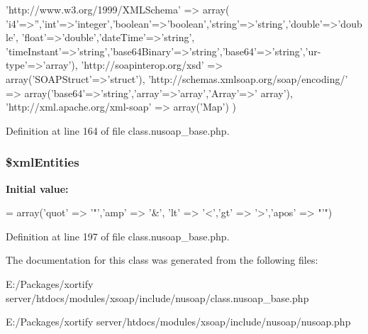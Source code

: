 \begin{DoxyCode}
    \textcolor{stringliteral}{'http://www.w3.org/1999/XMLSchema'} => array(
        \textcolor{stringliteral}{'i4'}=>\textcolor{stringliteral}{''},\textcolor{stringliteral}{'int'}=>\textcolor{stringliteral}{'integer'},\textcolor{stringliteral}{'boolean'}=>\textcolor{stringliteral}{'boolean'},\textcolor{stringliteral}{'string'}=>\textcolor{stringliteral}{'string'},\textcolor{stringliteral}{'double'}=>\textcolor{stringliteral}{'double'},
        \textcolor{stringliteral}{'float'}=>\textcolor{stringliteral}{'double'},\textcolor{stringliteral}{'dateTime'}=>\textcolor{stringliteral}{'string'},
        \textcolor{stringliteral}{'timeInstant'}=>\textcolor{stringliteral}{'string'},\textcolor{stringliteral}{'base64Binary'}=>\textcolor{stringliteral}{'string'},\textcolor{stringliteral}{'base64'}=>\textcolor{stringliteral}{'string'},\textcolor{stringliteral}{'ur-type'}=>\textcolor{stringliteral}{'array'}),
    \textcolor{stringliteral}{'http://soapinterop.org/xsd'} => array(\textcolor{stringliteral}{'SOAPStruct'}=>\textcolor{stringliteral}{'struct'}),
    \textcolor{stringliteral}{'http://schemas.xmlsoap.org/soap/encoding/'} => array(\textcolor{stringliteral}{'base64'}=>\textcolor{stringliteral}{'string'},\textcolor{stringliteral}{'array'}=>\textcolor{stringliteral}{'array'},\textcolor{stringliteral}{'Array'}=>\textcolor{stringliteral}{'
      array'}),
    \textcolor{stringliteral}{'http://xml.apache.org/xml-soap'} => array(\textcolor{stringliteral}{'Map'})
    )
\end{DoxyCode}


Definition at line 164 of file class.\-nusoap\-\_\-base.\-php.

\hypertarget{classnusoap__base_a912a5d3348012e245bb16e2cab11d4cc}{
\subsubsection[{\$xml\-Entities}]{\setlength{\rightskip}{0pt plus 5cm}\$xml\-Entities}}\label{classnusoap__base_a912a5d3348012e245bb16e2cab11d4cc}
{\bfseries Initial value\-:}
\begin{DoxyCode}
= array(\textcolor{stringliteral}{'quot'} => \textcolor{charliteral}{'"'},\textcolor{stringliteral}{'amp'} => \textcolor{charliteral}{'&'},
        \textcolor{stringliteral}{'lt'} => \textcolor{charliteral}{'<'},\textcolor{stringliteral}{'gt'} => \textcolor{charliteral}{'>'},\textcolor{stringliteral}{'apos'} => \textcolor{stringliteral}{"'"})
\end{DoxyCode}


Definition at line 197 of file class.\-nusoap\-\_\-base.\-php.



The documentation for this class was generated from the following files\-:\begin{DoxyCompactItemize}
\item 
E\-:/\-Packages/xortify server/htdocs/modules/xsoap/include/nusoap/class.\-nusoap\-\_\-base.\-php\item 
E\-:/\-Packages/xortify server/htdocs/modules/xsoap/include/nusoap/nusoap.\-php\end{DoxyCompactItemize}
